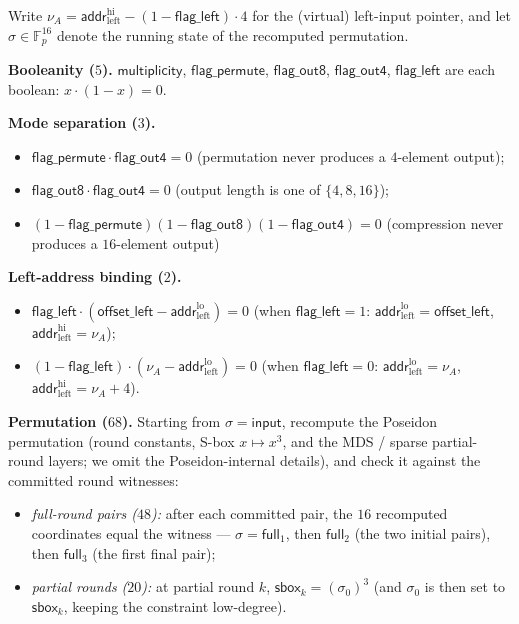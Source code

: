 \documentclass{article}
\theoremstyle{definition}
\newcommand{\Fp}{\mathbb F_p}
\begin{document}
Write $\nu_A = \textsf{addr}^\text{hi}_\text{left} - (1 - \textsf{flag\_left}) \cdot 4$ for the (virtual) left-input pointer, and let $\sigma \in \Fp^{16}$ denote the running state of the recomputed permutation.

\textbf{Booleanity ($5$).} $\textsf{multiplicity}$, $\textsf{flag\_permute}$, $\textsf{flag\_out8}$, $\textsf{flag\_out4}$, $\textsf{flag\_left}$ are each boolean: $x \cdot (1 - x) = 0$.

\textbf{Mode separation ($3$).}
\begin{itemize}
    \item $\textsf{flag\_permute} \cdot \textsf{flag\_out4} = 0$ \quad (permutation never produces a $4$-element output);
    \item $\textsf{flag\_out8} \cdot \textsf{flag\_out4} = 0$ \quad (output length is one of $\{4, 8, 16\}$);
    \item $(1 - \textsf{flag\_permute})(1 - \textsf{flag\_out8})(1 - \textsf{flag\_out4}) = 0$ \quad (compression never produces a $16$-element output)
\end{itemize}

\textbf{Left-address binding ($2$).}
\begin{itemize}
    \item $\textsf{flag\_left} \cdot (\textsf{offset\_left} - \textsf{addr}^\text{lo}_\text{left}) = 0$ \quad (when $\textsf{flag\_left} = 1$: $\textsf{addr}^\text{lo}_\text{left} = \textsf{offset\_left}$, $\textsf{addr}^\text{hi}_\text{left} = \nu_A$);
    \item $(1 - \textsf{flag\_left}) \cdot (\nu_A - \textsf{addr}^\text{lo}_\text{left}) = 0$ \quad (when $\textsf{flag\_left} = 0$: $\textsf{addr}^\text{lo}_\text{left} = \nu_A$, $\textsf{addr}^\text{hi}_\text{left} = \nu_A + 4$).
\end{itemize}

\textbf{Permutation ($68$).} Starting from $\sigma = \textsf{input}$, recompute the Poseidon permutation (round constants, S-box $x \mapsto x^3$, and the MDS / sparse partial-round layers; we omit the Poseidon-internal details), and check it against the committed round witnesses:
\begin{itemize}
    \item \emph{full-round pairs ($48$):} after each committed pair, the $16$ recomputed coordinates equal the witness — $\sigma = \textsf{full}_1$, then $\textsf{full}_2$ (the two initial pairs), then $\textsf{full}_3$ (the first final pair);
    \item \emph{partial rounds ($20$):} at partial round $k$, $\textsf{sbox}_k = (\sigma_0)^3$ (and $\sigma_0$ is then set to $\textsf{sbox}_k$, keeping the constraint low-degree).
\end{itemize}
\end{document}
